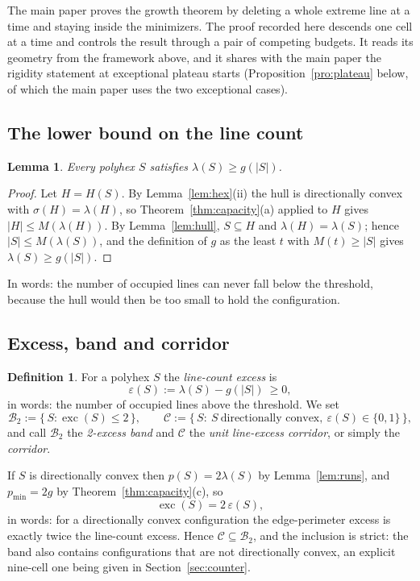 \documentclass[11pt]{article}
\theoremstyle{plain}
\newtheorem{lemma}[theorem]{Lemma}
\theoremstyle{definition}
\newtheorem{definition}[theorem]{Definition}
\theoremstyle{remark}
\DeclareMathOperator{\exc}{exc}
\begin{document}
The main paper proves the growth theorem by deleting a whole extreme line at a time and
staying inside the minimizers. The proof recorded here descends one cell at a time and
controls the result through a pair of competing budgets. It reads its geometry from the
framework above, and it shares with the main paper the rigidity statement at exceptional
plateau starts (Proposition~\ref{pro:plateau} below, of which the main paper uses the two
exceptional cases).

\subsection{The lower bound on the line count}\label{sec:9.1}

\begin{lemma}\label{lem:lowerlines}
Every polyhex \(S\) satisfies \(\lambda(S)\ge g(|S|)\).
\end{lemma}

\begin{proof}
Let \(H=H(S)\). By Lemma~\ref{lem:hex}(ii) the hull is directionally convex with
\(\sigma(H)=\lambda(H)\), so Theorem~\ref{thm:capacity}(a) applied to \(H\) gives
\(|H|\le M(\lambda(H))\). By Lemma~\ref{lem:hull}, \(S\subseteq H\) and
\(\lambda(H)=\lambda(S)\); hence \(|S|\le M(\lambda(S))\), and the definition of \(g\) as
the least \(t\) with \(M(t)\ge|S|\) gives \(\lambda(S)\ge g(|S|)\).
\end{proof}

In words: the number of occupied lines can never fall below the threshold, because the hull
would then be too small to hold the configuration.

\subsection{Excess, band and corridor}\label{sec:9.2}

\begin{definition}\label{def:eps}
For a polyhex \(S\) the \emph{line-count excess} is
\[
   \varepsilon(S):=\lambda(S)-g(|S|)\ \ge 0 ,
\]
in words: the number of occupied lines above the threshold. We set
\[
   \mathcal{B}_{2}:=\{\,S:\exc(S)\le2\,\},\qquad
   \mathcal{C}:=\{\,S:\ S\ \text{directionally convex},\ \varepsilon(S)\in\{0,1\}\,\},
\]
and call \(\mathcal{B}_{2}\) the \emph{2-excess band} and \(\mathcal{C}\) the \emph{unit
line-excess corridor}, or simply the \emph{corridor}.
\end{definition}

If \(S\) is directionally convex then \(p(S)=2\lambda(S)\) by Lemma~\ref{lem:runs}, and
\(p_{\min}=2g\) by Theorem~\ref{thm:capacity}(c), so
\begin{equation}\label{eq:exc2eps}
   \exc(S)=2\,\varepsilon(S),
\end{equation}
in words: for a directionally convex configuration the edge-perimeter excess is exactly
twice the line-count excess. Hence \(\mathcal{C}\subseteq\mathcal{B}_{2}\), and the
inclusion is strict: the band also contains configurations that are not directionally
convex, an explicit nine-cell one being given in Section~\ref{sec:counter}.
\end{document}
